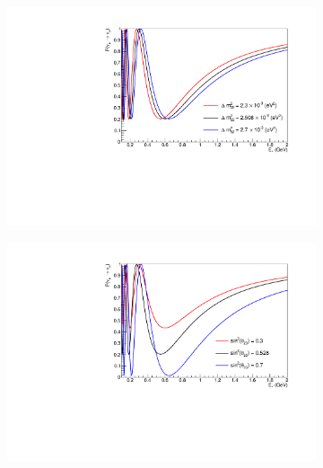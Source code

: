 \begin{figure}[h]
  \begin{subfigure}[t]{0.5\textwidth}
    \includegraphics[width=\textwidth, trim={0mm 0mm 0mm 0mm}, clip,page=1]{Figures/Oscillation/T2K_NuMu_x_NuMu_DelMsq32Sens.pdf}
  \end{subfigure}%
  \begin{subfigure}[t]{0.5\textwidth}
    \includegraphics[width=\textwidth, trim={0mm 0mm 0mm 0mm}, clip,page=1]{Figures/Oscillation/T2K_NuMu_x_NuMu_Sinsqth23Sens.pdf}
  \end{subfigure}
  \begin{subfigure}[t]{0.5\textwidth}

\end{subfigure}
\end{figure}
